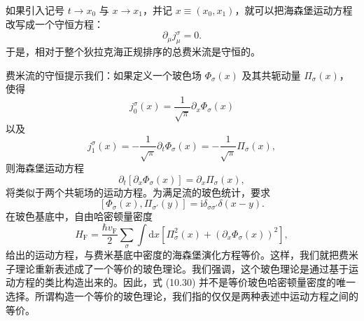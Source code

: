 如果引入记号 $t\to x_{0}$ 与 $x\to x_{1}$，并记 $x\equiv(x_{0},x_{1})$，就可以把海森堡运动方程改写成一个守恒方程：
\begin{equation*}
\partial_{\mu}j_{\mu}^{\sigma}=0.
\tag{10.25}
\end{equation*}
于是，相对于整个狄拉克海正规排序的总费米流是守恒的。

费米流的守恒提示我们：如果定义一个玻色场 $\Phi_{\sigma}(x)$ 及其共轭动量 $\Pi_{\sigma}(x)$，使得
\begin{equation*}
j_{0}^{\sigma}(x)=\frac{1}{\sqrt{\pi}}\partial_{x}\Phi_{\sigma}(x)
\tag{10.26}
\end{equation*}
以及
\begin{equation*}
j_{1}^{\sigma}(x)=-\frac{1}{\sqrt{\pi}}\partial_{t}\Phi_{\sigma}(x)=-\frac{1}{\sqrt{\pi}}\Pi_{\sigma}(x),
\tag{10.27}
\end{equation*}
则海森堡运动方程
\begin{equation*}
\partial_{t}\left[\partial_{x}\Phi_{\sigma}(x)\right]=\partial_{x}\Pi_{\sigma}(x),
\tag{10.28}
\end{equation*}
将类似于两个共轭场的运动方程。为满足流的玻色统计，要求
\begin{equation*}
\left[\Phi_{\sigma}(x),\Pi_{\sigma'}(y)\right]=\mathrm{i}\delta_{\sigma\sigma'}\delta(x-y).
\tag{10.29}
\end{equation*}
在玻色基底中，自由哈密顿量密度
\begin{equation*}
H_{\mathrm{F}}=\frac{\hbar v_{\mathrm{F}}}{2}\sum_{\sigma}\int\mathrm{d}x\left[\Pi_{\sigma}^{2}(x)+\left(\partial_{x}\Phi_{\sigma}(x)\right)^{2}\right],
\tag{10.30}
\end{equation*}
给出的运动方程，与费米基底中密度的海森堡演化方程等价。这样，我们就把费米子理论重新表述成了一个等价的玻色理论。我们强调，这个玻色理论是通过基于运动方程的类比构造出来的。因此，式 (10.30) 并不是等价玻色哈密顿量密度的唯一选择。所谓构造一个等价的玻色理论，我们指的仅仅是两种表述中运动方程之间的等价。

